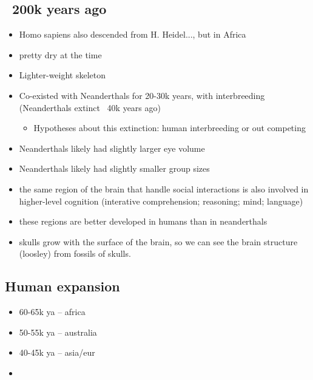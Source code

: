 \documentclass{article}
\theoremstyle{definition}
\begin{document}
\subsection{~200k years ago}
\begin{itemize}
	\item Homo sapiens also descended from H. Heidel..., but in Africa
	\item pretty dry at the time
	\item Lighter-weight skeleton
	\item Co-existed with Neanderthals for 20-30k years, with interbreeding (Neanderthals extinct  ~40k years ago)
		\begin{itemize}
			\item Hypotheses about this extinction: human interbreeding or out competing
		\end{itemize}
	\item Neanderthals likely had slightly larger eye volume
	\item Neanderthals likely had slightly smaller group sizes
	\item the same region of the brain that handle social interactions is also involved in higher-level cognition (interative comprehension; reasoning; mind; language)
	\item these regions are better developed in humans than in neanderthals
	\item skulls grow with the surface of the brain, so we can see the brain structure (loosley) from fossils of skulls. 
\end{itemize}

\subsection{Human expansion}
\begin{itemize}
	\item 60-65k ya -- africa
	\item 50-55k ya -- australia
	\item 40-45k ya -- asia/eur
	\item
\end{itemize}
\end{document}
